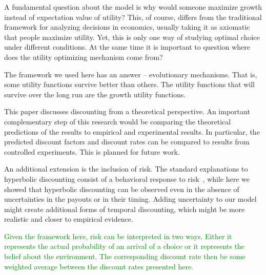\documentclass[11pt]{article}
\numberwithin{equation}{section}
\begin{document}
A fundamental question about the model is why would someone maximize growth instead of expectation value of utility? This, of course, differs from the traditional framework for analyzing decisions in economics, usually taking it as axiomatic that people maximize utility. Yet, this is only one way of studying optimal choice under different conditions. At the same time it is important to question where does the utility optimizing mechanism come from?

The framework we used here has an answer -- evolutionary mechanisms. That is, some utility functions survive better than others. The utility functions that will survive over the long run are the growth utility functions.

This paper discusses discounting from a theoretical perspective. An important complementary step of this research would be comparing the theoretical predictions of the results to empirical and experimental results. In particular, the predicted discount factors and discount rates can be compared to results from controlled experiments. This is planned for future work.

An additional extension is the inclusion of risk. The standard explanations to hyperbolic discounting consist of a behavioral response to risk~\citep{sozou1998hyperbolic,dasgupta2005uncertainty}, while here we showed that hyperbolic discounting can be observed even in the absence of uncertainties in the payouts or in their timing. Adding uncertainty to our model might create additional forms of temporal discounting, which might be more realistic and closer to empirical evidence.

\textcolor{green}{Given the framework here, risk can be interpreted in two ways. Either it represents the actual probability of an arrival of a choice or it represents the belief about the environment. The corresponding discount rate then be some weighted average between the discount rates presented here. }

\end{document}
